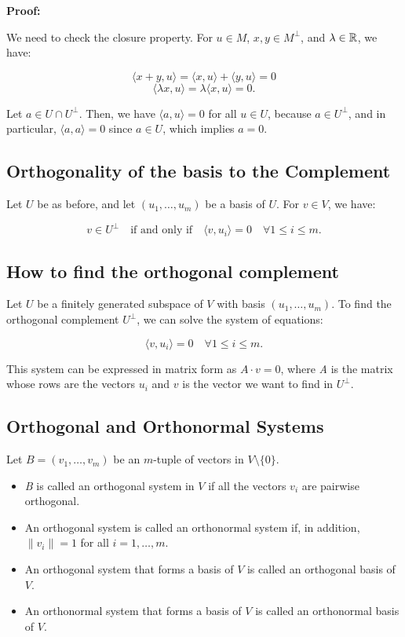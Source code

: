 \textbf{Proof:}
\vspace{\baselineskip}

We need to check the closure property. For \( u \in M \), \( x, y \in M^\perp \), and 
\( \lambda \in \mathbb{R} \), we have:

\[
    \langle x + y, u \rangle = \langle x, u \rangle + \langle y, u \rangle = 0
\]
\[
    \langle \lambda x, u \rangle = \lambda \langle x, u \rangle = 0.
\]

Let \( a \in U \cap U^\perp \). Then, we have \( \langle a, u \rangle = 0 \) for all \( u \in U \), 
because \( a \in U^\perp \), and in particular, \( \langle a, a \rangle = 0 \) since \( a \in U \), 
which implies \( a = 0 \).

\subsection{Orthogonality of the basis to the Complement}

Let \( U \) be as before, and let \( (u_1, \ldots, u_m) \) be a basis of \( U \). For \( v \in V \), we 
have:

\[
    v \in U^\perp \quad \text{if and only if} \quad \langle v, u_i \rangle = 0 \quad \forall 1 \leq i \leq m.
\]

\subsection{How to find the orthogonal complement}

Let \( U \) be a finitely generated subspace of \( V \) with basis \( (u_1, \ldots, u_m) \). To find the 
orthogonal complement \( U^\perp \), we can solve the system of equations:

\[
\langle v, u_i \rangle = 0 \quad \forall 1 \leq i \leq m.
\]

This system can be expressed in matrix form as \( A \cdot v = 0 \), where \emph{A} is the matrix whose rows 
are the vectors \( u_i \) and \( v \) is the vector we want to find in \( U^\perp \).

\subsection{Orthogonal and Orthonormal Systems}

Let \( B = (v_1, \ldots, v_m) \) be an \( m \)-tuple of vectors in \( V \setminus \{0\} \).

\begin{itemize}
    \item \emph{B} is called an orthogonal system in \( V \) if all the vectors \( v_i \) are pairwise 
          orthogonal.
    \item An orthogonal system is called an orthonormal system if, in addition, \( \|v_i\| = 1 \) for 
          all \( i = 1, \ldots, m \).
    \item An orthogonal system that forms a basis of \( V \) is called an orthogonal basis of \( V \).
    \item An orthonormal system that forms a basis of \( V \) is called an orthonormal basis of \( V \).
\end{itemize}

